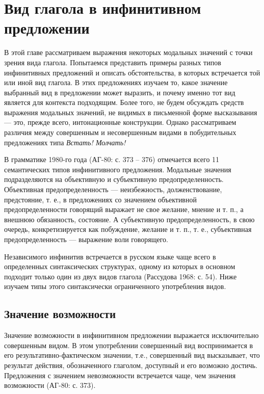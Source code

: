 \section{Вид глагола в инфинитивном предложении}

В этой главе рассматриваем выражения некоторых модальных значений с точки зрения вида глагола. Попытаемся представить примеры разных типов инфинитивных предложений и описать обстоятельства, в которых встречается той или иной вид глагола. В этих предложениях изучаем то, какое значение выбранный вид в предложении может выразить, и почему именно тот вид является для контекста подходящим. Более того, не будем обсуждать средств выражения модальных значений, не видимых в письменной форме высказывания --- это, прежде всего, интонационные конструкции. Однако рассматриваем различия между совершенным и несовершенным видами в побудительных предложениях типа \textit{Встать! Молчать!}

В грамматике 1980-го года (АГ-80: с. 373 -- 376) отмечается всего 11 семантических типов инфинитивного предложения. Модальные значения подразделяются на объективную и субъективную предопределенность. Объективная предопределенность --- неизбежность, долженствование, предстояние, т. е., в предложениях со значением объективной предопределенности говорящий выражает не свое желание, мнение и т. п., а внешнюю обязанность, состояние. А субъективную предопределенность, в свою очередь, конкретизируется как побуждение, желание и т. п., т. е., субъективная предопределенность --- выражение воли говорящего.

Независимого инфинитив встречается в русском языке чаще всего в определенных синтаксических структурах, одному из которых в основном подходит только один из двух видов глагола (Рассудова 1968: с. 54). Ниже изучаем типы этого синтаксически ограниченного употребления видов.

\subsection{Значение возможности}

Значение возможности в инфинитивном предложении выражается исключительно совершенным видом. В этом употреблении совершенный вид воспринимается в его результативно-фактическом значении, т.е., совершенный вид высказывает, что результат действия, обозначенного глаголом, доступный и его возможно достичь. Предложения с значением невозможности встречается чаще, чем значения возможности (АГ-80: с. 373). 

